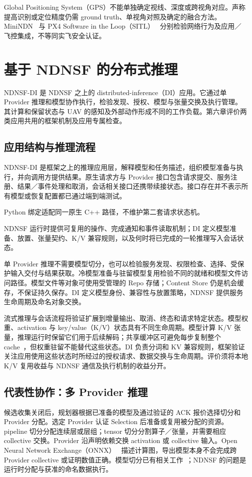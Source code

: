 Global Positioning System（GPS）不能单独确定视线、深度或跨视角对应。声称提高识别或定位精度仍需 ground truth、单视角对照及确定的融合方法。MiniNDN~\cite{minindn} 与 PX4 Software in the Loop（SITL）~\cite{px4} 分别检验网络行为及应用／飞控集成，不等同实飞安全认证。

\chapter{基于 NDNSF 的分布式推理}
\label{chap:di-ch}
NDNSF-DI 是 NDNSF 之上的 distributed-inference（DI）应用。它通过单 Provider 推理和模型协作执行，检验发现、授权、模型与张量交换及执行管理。其计算和保留状态与 UAV 的感知及外部动作形成不同的工作负载。第六章评价两类应用共用的框架机制及应用专属检查。

\section{应用结构与推理流程}
NDNSF-DI 是框架之上的推理应用层，解释模型和任务描述，组织模型准备与执行，并向调用方提供结果。原生请求方与 Provider 接口包含请求提交、服务注册、结果／事件处理和取消，会话相关接口还携带续接状态。接口存在并不表示所有模型或恢复配置都已通过端到端测试。

Python 绑定适配同一原生 C++ 路径，不维护第二套请求状态机。

NDNSF 运行时提供可复用的操作、完成通知和事件读取机制；DI 定义模型准备、放置、张量契约、K/V 兼容规则，以及何时将已完成的一轮推理写入会话状态。

单 Provider 推理不需要模型切分，也可以检验服务发现、权限检查、选择、受保护输入交付与结果获取。冷模型准备与驻留模型复用检验不同的就绪和模型文件访问路径。模型文件等对象可使用受管理的 Repo 存储；Content Store 仍是机会缓存，不保证持久保存。DI 定义模型身份、兼容性与放置策略，NDNSF 提供服务生命周期及命名对象交换。

流式推理与会话流程将验证扩展到增量输出、取消、终态和请求特定状态。模型权重、activation 与 key/value（K/V）状态具有不同生命周期。模型计算 K/V 张量，推理运行时保留它们用于后续解码；共享缓冲区可避免每步复制整个 cache~\cite{ortkvcache}，但权重驻留不能替代这些状态。DI 负责分词和 KV 兼容规则，框架验证关注应用使用这些状态时所经过的授权请求、数据交换与生命周期。评价须将本地 K/V 复用收益与 NDNSF 通信及执行机制的收益分开。

\section{代表性协作：多 Provider 推理}
候选收集关闭后，规划器根据已准备的模型及通过验证的 ACK 报价选择切分和 Provider 分配。选定 Provider 认证 Selection 后准备或复用被分配的资源。pipeline 切分分配连续层或层组；tensor 切分分割算子／张量，并需要相应 collective 交换。Provider 沿声明依赖交换 activation 或 collective 输入。Open Neural Network Exchange（ONNX）~\cite{onnx} 描述计算图，导出模型本身不会完成跨 Provider collective 或证明数值正确。模型切分已有相关工作~\cite{neurosurgeon,ddnn}；NDNSF 的问题是运行时分配与获准的命名数据执行。

